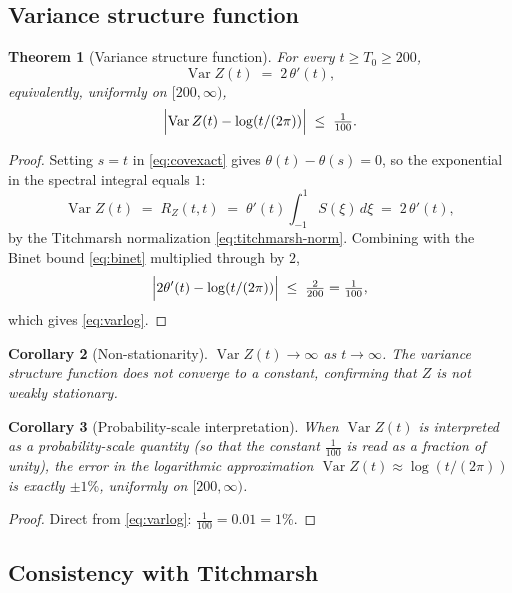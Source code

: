 \documentclass[11pt]{amsart}
\newtheorem{theorem}{Theorem}[section]
\newtheorem{corollary}[theorem]{Corollary}
\theoremstyle{definition}
\DeclareMathOperator{\Var}{Var}
\begin{document}
\subsection{Variance structure function}

\begin{theorem}[Variance structure function]\label{thm:var}
For every $t\ge T_{0}\ge 200$,
\begin{equation}\label{eq:varexact}
\Var Z(t) \;=\; 2\,\theta'(t),
\end{equation}
equivalently, uniformly on $[200,\infty)$,
\begin{equation}\label{eq:varlog}
\Bigl|\Var Z(t)-\log(t/(2\pi))\Bigr|\;\le\;\tfrac{1}{100}.
\end{equation}
\end{theorem}

\begin{proof}
Setting $s=t$ in \eqref{eq:covexact} gives $\theta(t)-\theta(s)=0$, so
the exponential in the spectral integral equals $1$:
\[
\Var Z(t) \;=\; R_{Z}(t,t) \;=\; \theta'(t)\int_{-1}^{1}S(\xi)\,d\xi
\;=\; 2\,\theta'(t),
\]
by the Titchmarsh normalization \eqref{eq:titchmarsh-norm}. Combining with
the Binet bound \eqref{eq:binet} multiplied through by $2$,
\[
\Bigl|2\theta'(t)-\log(t/(2\pi))\Bigr|\;\le\;\tfrac{2}{200}=\tfrac{1}{100},
\]
which gives \eqref{eq:varlog}.
\end{proof}

\begin{corollary}[Non-stationarity]
$\Var Z(t)\to\infty$ as $t\to\infty$. The variance structure function
does not converge to a constant, confirming that $Z$ is not weakly
stationary.
\end{corollary}

\begin{corollary}[Probability-scale interpretation]\label{cor:prob}
When $\Var Z(t)$ is interpreted as a probability-scale quantity (so that
the constant $\tfrac{1}{100}$ is read as a fraction of unity), the error
in the logarithmic approximation $\Var Z(t)\approx\log(t/(2\pi))$ is
exactly $\pm 1\%$, uniformly on $[200,\infty)$.
\end{corollary}

\begin{proof}
Direct from \eqref{eq:varlog}: $\tfrac{1}{100}=0.01=1\%$.
\end{proof}

\subsection{Consistency with Titchmarsh}
\end{document}

